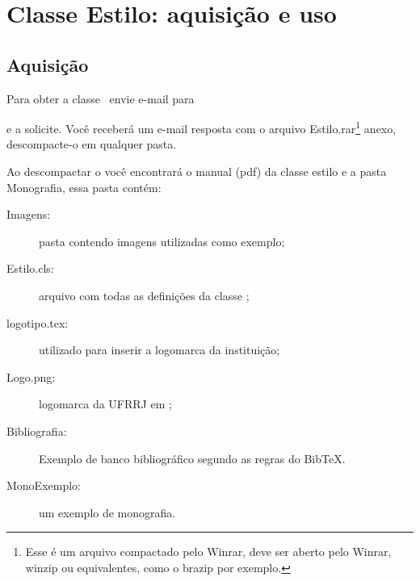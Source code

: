 
\chapter{Classe Estilo: aquisição e uso}


\section{Aquisição}

Para obter a classe \estilo\ envie e-mail para

\begin{center}
	\ttt{\textcolor{estilo}{matematica.ufrrjim@gmail.com}}
\end{center}
e a solicite. Você receberá um e-mail resposta com o arquivo
Estilo.rar\footnote{Esse é um arquivo compactado pelo Winrar,
deve ser aberto pelo Winrar, winzip ou equivalentes, como
o brazip por exemplo.} anexo, descompacte-o em  qualquer
pasta.

Ao descompactar o  você encontrará o manual (pdf) da 
classe estilo e a pasta Monografia, essa pasta contém:
\begin{description}
    \item[Imagens:] pasta contendo imagens utilizadas como exemplo;
    \item[Estilo.cls:] arquivo com todas as definições da classe \estilo;
    \item[logotipo.tex:] utilizado para inserir a logomarca da instituição;
    \item[Logo.png:] logomarca da UFRRJ em ;
    \item[Bibliografia:] Exemplo de banco bibliográfico segundo as regras
	    do Bib\TeX.
    \item[MonoExemplo:] um exemplo de monografia.
\end{description}



